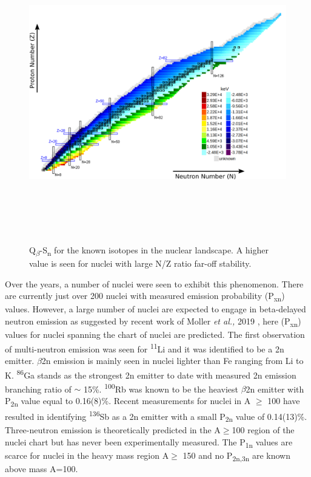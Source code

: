 \begin{figure}[h]
	\centering
	\includegraphics[width=16cm, height=13cm]{figures/Qb_Sn.png}
	\caption[Q{\textsubscript{$\beta$}}-S{\textsubscript{n}} for nuclei in the chart of nuclei..]{Q{\textsubscript{$\beta$}}-S{\textsubscript{n}} for the known isotopes in the nuclear landscape. A higher value is seen for nuclei with large N/Z ratio far-off stability.}
	\label{fig:qb-sn}
\end{figure}  

Over the years, a number of nuclei were seen to exhibit this phenomenon. There are currently just over 200 nuclei with measured emission probability (P\textsubscript{xn}) values. However, a large number of nuclei are expected to engage in beta-delayed neutron emission as suggested by recent work of Moller \textit{et al.,} 2019 \citep{MOLLER20191}, here (P\textsubscript{xn}) values for nuclei spanning the chart of nuclei are predicted. The first observation of multi-neutron emission was seen for \textsuperscript{11}Li and it was identified to be a 2n emitter. $\beta$2n emission is mainly seen in nuclei lighter than Fe ranging from Li to K. \textsuperscript{86}Ga \citep{Yokoyama2018, 86Ga} stands as the strongest 2n emitter to date with measured 2n emission branching ratio of $\sim$ 15\%. \textsuperscript{100}Rb was known to be the heaviest $\beta$2n emitter with P\textsubscript{2n} value equal to 0.16(8)\%. Recent measurements for nuclei in A $\geq$ 100 have resulted in identifying \textsuperscript{136}Sb as a 2n emitter with a small P\textsubscript{2n} value of 0.14(13)\%. Three-neutron emission is theoretically predicted in the A$\geq$100 region of the nuclei chart \citep{MOLLER20191} but has never been experimentally measured. The P\textsubscript{1n} values are scarce for nuclei in the heavy mass region A$\geq$ 150 and no P\textsubscript{2n,3n} are known above mass A=100. 




